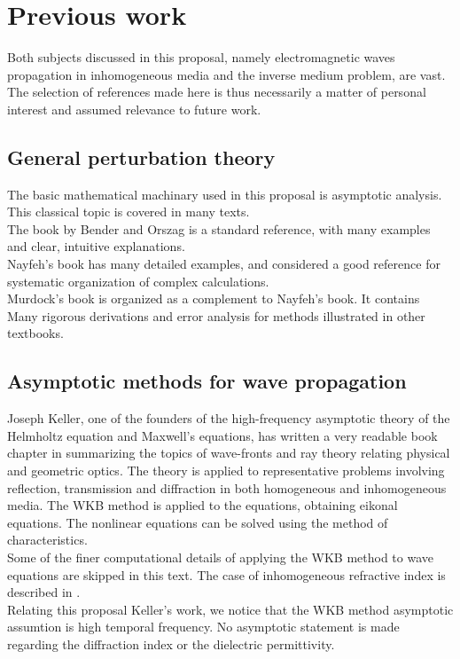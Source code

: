 \documentclass[12pt,twoside]{report}
\begin{document}
\section{Previous work}
Both subjects discussed in this proposal, namely electromagnetic waves propagation in inhomogeneous media and the inverse medium problem, are vast. The selection of references made here is thus necessarily a matter of personal interest and assumed relevance to future work.

\subsection{General perturbation theory}
The basic mathematical machinary used in this proposal is asymptotic analysis. This classical topic is covered in many texts. \\
The book by Bender and Orszag \cite{BenderOrszag1999} is a standard reference, with many examples and clear, intuitive explanations.\\
Nayfeh's book \cite{Nayfeh1981} has many detailed examples, and considered a good reference for systematic organization of complex calculations.\\
Murdock's book \cite{Murdock1991} is organized as a complement to Nayfeh's book. It contains Many rigorous derivations and error analysis for methods illustrated in other textbooks.

\subsection{Asymptotic methods for wave propagation}
Joseph Keller, one of the founders of the high-frequency asymptotic theory of the Helmholtz equation and Maxwell's equations, has written a very readable book chapter in \cite{Keller1995} summarizing the topics of wave-fronts and ray theory relating physical and geometric optics. The theory is applied to representative problems involving reflection, transmission and diffraction in both homogeneous and inhomogeneous media. The WKB method is applied to the equations, obtaining eikonal equations. The nonlinear equations can be solved using the method of characteristics.\\
Some of the finer computational details of applying the WKB method to wave equations are skipped in this text. The case of inhomogeneous refractive index is described in \cite{SecklerKeller1959}.\\

Relating this proposal Keller's work, we notice that the WKB method asymptotic assumtion is high temporal frequency. No asymptotic statement is made regarding the diffraction index or the dielectric permittivity.\\
\end{document}
